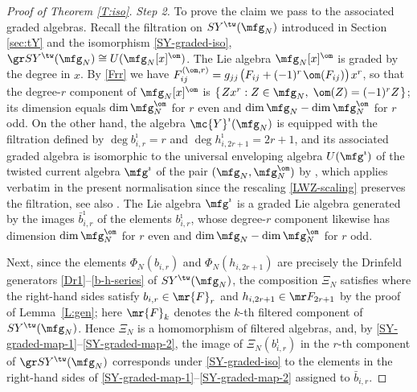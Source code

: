 \documentclass{amsart}
\numberwithin{equation}{section}
\theoremstyle{remark}
\renewcommand{\,}{\kern 0.1em} %
\begin{document}
\begin{proof}[Proof of Theorem \ref{T:iso}]
{\it Step 2.} To prove the claim we pass to the associated graded algebras. Recall the filtration on $SY^{\tw}(\mfg_N)$ introduced in Section \ref{sec:tY} and the isomorphism \eqref{SY-graded-iso}, $\gr SY^{\tw}(\mfg_N) \cong U(\mfg_N[x]^{\om})$. The Lie algebra $\mfg_N[x]^{\om}$ is graded by the degree in $x$. By \eqref{Frr} we have $F^{(\om,r)}_{ij} = g_{jj}\,\big(F_{ij} + (-1)^r\,\om(F_{ij})\big)\,x^r$, so that the degree-$r$ component of $\mfg_N[x]^{\om}$ is $\{\, Z x^r : Z \in \mfg_N ,\; \om(Z) = (-1)^r Z \,\}$; its dimension equals $\dim \mfg_N^{\om}$ for $r$ even and $\dim\mfg_N - \dim\mfg_N^{\om}$ for $r$ odd. On the other hand, the algebra $\mc{Y}^{\imath}(\mfg_N)$ is equipped with the filtration defined by $\deg b^{\imath}_{i,r} = r$ and $\deg h^{\imath}_{i,2r+1} = 2r+1$, and its associated graded algebra is isomorphic to the universal enveloping algebra $U(\mfg^{\imath})$ of the twisted current algebra $\mfg^{\imath}$ of the pair $(\mfg_N,\mfg_N^{\om})$ by \cite[Cor.~4.13]{LWZ25b}, which applies verbatim in the present normalisation since the rescaling \eqref{LWZ-scaling} preserves the filtration, see also \cite[\S2.3]{Lu26a}. The Lie algebra $\mfg^{\imath}$ is a graded Lie algebra generated by the images $\bar b^{\imath}_{i,r}$ of the elements $b^{\imath}_{i,r}$, whose degree-$r$ component likewise has dimension $\dim\mfg^{\om}_N$ for $r$ even and $\dim\mfg_N - \dim\mfg^{\om}_N$ for $r$ odd.

Next, since the elements $\Phi_N(b_{i,r})$ and $\Phi_N(h_{i,2r+1})$ are precisely the Drinfeld generators \eqref{Dr1}--\eqref{b-h-series} of $SY^{\tw}(\mfg_N)$, the composition $\Xi_N$ satisfies
%
%
where the right-hand sides satisfy $b_{i,r} \in \mr{F}_r$ and $h_{i,2r+1}\in \mr F_{2r+1}$ by the proof of Lemma~\ref{L:gen}; here $\mr{F}_k$ denotes the $k$-th filtered component of $SY^{\tw}(\mfg_N)$. Hence $\Xi_N$ is a homomorphism of filtered algebras, and, by \eqref{SY-graded-map-1}--\eqref{SY-graded-map-2}, the image of $\Xi_N(b^{\imath}_{i,r})$ in the $r$-th component of $\gr SY^{\tw}(\mfg_N)$ corresponds under \eqref{SY-graded-iso} to the elements in the right-hand sides of \eqref{SY-graded-map-1}--\eqref{SY-graded-map-2} assigned to $\bar b_{i,r}$.


\end{proof}
\end{document}

